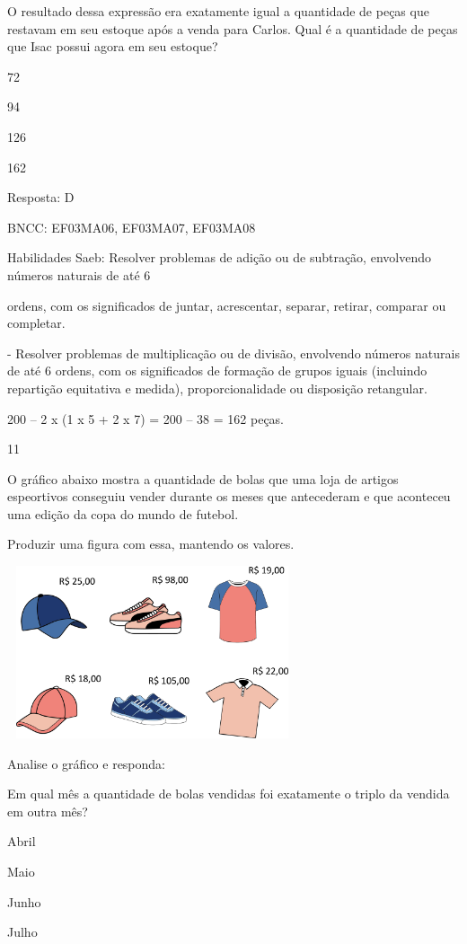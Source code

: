 \begin{escolha}
O resultado dessa expressão era exatamente igual a quantidade de peças
que restavam em seu estoque após a venda para Carlos. Qual é a
quantidade de peças que Isac possui agora em seu estoque?

\begin{escolha}
\item
  72
\item
  94
\item
  126
\item
  162
\end{escolha}

Resposta: D

BNCC: EF03MA06, EF03MA07, EF03MA08

Habilidades Saeb: Resolver problemas de adição ou de subtração,
envolvendo números naturais de até 6

ordens, com os significados de juntar, acrescentar, separar, retirar,
comparar ou completar.

- Resolver problemas de multiplicação ou de divisão, envolvendo números
naturais de até 6 ordens, com os significados de formação de grupos
iguais (incluindo repartição equitativa e medida), proporcionalidade ou
disposição retangular.

200 -- 2 x (1 x 5 + 2 x 7) = 200 -- 38 = 162 peças.

\num{11}

O gráfico abaixo mostra a quantidade de bolas que uma loja de artigos
espeortivos conseguiu vender durante os meses que antecederam e que
aconteceu uma edição da copa do mundo de futebol.

Produzir uma figura com essa, mantendo os valores.

\includegraphics[width=3.36538in,height=2.00040in]{media/image120.png}

Analise o gráfico e responda:

Em qual mês a quantidade de bolas vendidas foi exatamente o triplo da
vendida em outra mês?

\begin{escolha}
\item
  Abril
\item
  Maio
\item
  Junho
\item
  Julho
\end{escolha}


\end{escolha}
